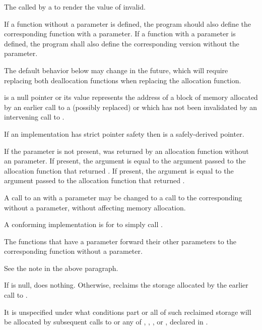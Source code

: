 \begin{itemdescr}
\pnum
\effects
The
called by a
to render the value of  invalid.

\pnum
\replaceable
{}
If a function without a  parameter is defined,
the program should also define
the corresponding function with a  parameter.
If a function with a  parameter is defined,
the program shall also define
the corresponding version without the  parameter.
\begin{note}
The default behavior below may change in the future, which will require
replacing both deallocation functions when replacing the allocation function.
\end{note}

\pnum
\expects
{} is a null pointer or
its value represents the address of
a block of memory allocated by
an earlier call to a (possibly replaced)
or
which has not been invalidated by an intervening call to
.

\pnum
\expects
If an implementation has strict pointer safety
then  is a safely-derived pointer.

\pnum
\expects
If the  parameter is not present,
 was returned by an allocation function
without an  parameter.
If present, the  argument
is equal to the  argument
passed to the allocation function that returned .
If present, the  argument
is equal to the  argument
passed to the allocation function that returned .

\pnum
\required
A call to an 
with a  parameter
may be changed to
a call to the corresponding 
without a  parameter,
without affecting memory allocation.
\begin{note}
A conforming implementation is for
 to simply call
.
\end{note}

\pnum
{}
The functions that have a  parameter
forward their other parameters
to the corresponding function without a  parameter.
\begin{note}
See the note in the above \replaceable paragraph.
\end{note}

\pnum
{}
If  is null, does nothing. Otherwise, reclaims the
storage allocated by the earlier call to .

\pnum
\remarks
It is unspecified under what conditions part or all of such
%
reclaimed storage will be allocated by subsequent
calls to
or any of
,
,
,
or
,
declared in .
\end{itemdescr}

